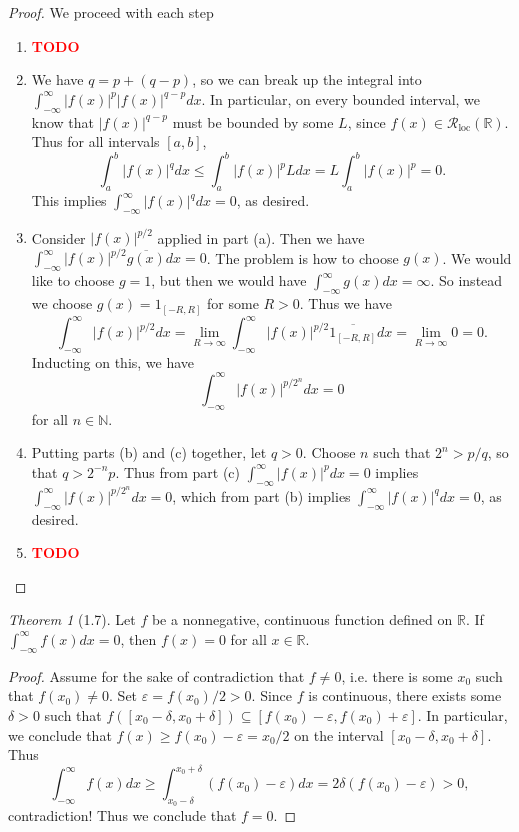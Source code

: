 \documentclass[12pt]{article}
\newcommand{\todo}{\textcolor{red}{\textbf{TODO }}}
\theoremstyle{remark}
\theoremstyle{named}
\newtheorem*{theorem}{Theorem}
\renewcommand{\d}{\delta}
\newcommand{\e}{\varepsilon}
\newcommand{\N}{\mathbb N}
\newcommand{\R}{\mathbb R}
\newcommand{\Rloc}{\mathcal R_{\text{loc}}}
\begin{document}
\begin{proof}
    We proceed with each step
    \begin{enumerate}
        \item \todo
        \item We have \(q = p + (q - p)\), so we can break up the integral into \(\int_{-\infty}^{\infty} |f(x)|^p |f(x)|^{q - p} dx\). In particular, on every bounded interval, we know that \(|f(x)|^{q - p}\) must be bounded by some \(L\), since \(f(x) \in \Rloc(\R)\). Thus for all intervals \([a, b]\),
        \[\int_{a}^{b} |f(x)|^q dx \leq \int_{a}^{b} |f(x)|^p L dx = L \int_{a}^{b} |f(x)|^p = 0.\]
        This implies \(\int_{-\infty}^{\infty} |f(x)|^q dx = 0\), as desired.
        \item Consider \(|f(x)|^{p/2}\) applied in part (a). Then we have \(\int_{-\infty}^{\infty}|f(x)|^{p/2}\overline{g(x)} dx = 0\). The problem is how to choose \(g(x)\). We would like to choose \(g = 1\), but then we would have \(\int_{-\infty}^{\infty} g(x) dx = \infty\). So instead we choose \(g(x) = 1_{[-R, R]}\) for some \(R > 0\). Thus we have 
        \[\int_{-\infty}^{\infty}|f(x)|^{p/2} dx = \lim_{R \to \infty} \int_{-\infty}^{\infty}|f(x)|^{p/2} \overline{1_{[-R, R]}} dx = \lim_{R \to \infty} 0 = 0.\]
        Inducting on this, we have 
        \[\int_{-\infty}^{\infty}|f(x)|^{p/2^n} dx = 0\]
        for all \(n \in \N\).

        \item Putting parts (b) and (c) together, let \(q > 0\). Choose \(n\) such that \(2^n > p/q\), so that \(q > 2^{-n} p\). Thus from part (c) \(\int_{-\infty}^{\infty}|f(x)|^{p} dx = 0\) implies \(\int_{-\infty}^{\infty}|f(x)|^{p/2^n} dx = 0\), which from part (b) implies \(\int_{-\infty}^{\infty}|f(x)|^{q} dx = 0\), as desired.
        \item \todo
    \end{enumerate}
\end{proof}

\begin{theorem}[1.7]
    Let \(f\) be a nonnegative, continuous function defined on \(\R\). If \(\int_{-\infty}^{\infty} f(x) dx = 0\), then \(f(x) = 0\) for all \(x \in \R\).
\end{theorem}

\begin{proof}
    Assume for the sake of contradiction that \(f \neq 0\), i.e. there is some \(x_0\) such that \(f(x_0) \neq 0\). Set \(\e = f(x_0)/2 > 0\). Since \(f\) is continuous, there exists some \(\d > 0\) such that \(f([x_0 - \d, x_0 + \d]) \subseteq [f(x_0) - \e, f(x_0) + \e]\). In particular, we conclude that \(f(x) \geq f(x_0) - \e = x_0 / 2\) on the interval \([x_0 - \d, x_0 + \d]\). Thus
    \[\int_{-\infty}^{\infty} f(x) dx \geq \int_{x_0 - \d}^{x_0 + \d} (f(x_0) - \e) dx = 2\d (f(x_0) - \e) > 0,\]
    contradiction! Thus we conclude that \(f = 0\).
\end{proof}
\end{document}
